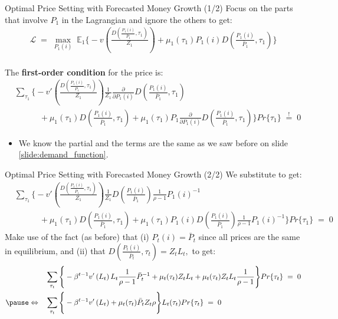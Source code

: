 \documentclass[10pt,c,aspectratio=1610,handout]{beamer}
\begin{document}
\begin{frame}{Optimal Price Setting with Forecasted Money Growth (1/2)}%
  Focus on the parts that involve $P_1$ in the Lagrangian and ignore the others to get:%
  \begin{align*}%
    \mathcal{L} \; = \; \max_{P_1(i)} \; \mathbb{E}_1 \Bigg\{ -v \left( \frac{D\left( \frac{P_{1}(i)}{\bar{P}_{1}}, \tau_1 \right)}{Z_{1}} \right) + \mu_1(\tau_1) P_1(i) D \left( \frac{P_{1}(i)}{\bar{P}_{1}}, \tau_1 \right)  \Bigg\}%
  \end{align*}\\%
  \vspace*{0.2in}%
  \pause%
  The \textbf{first-order condition} for the price is:%
  \begin{align*}%
    & \sum_{\tau_1} \Bigg \{ -v'\left( \frac{D\left( \frac{P_{1}(i)}{\bar{P}_{1}}, \tau_1 \right)}{Z_{1}} \right) \frac{1}{Z_{1}} \frac{\partial}{\partial P_1(i)} D\left( \frac{P_{1}(i)}{\bar{P}_{1}}, \tau_1 \right)\\%
    & \quad \quad \quad + \mu_1(\tau_1) D \left( \frac{P_{1}(i)}{\bar{P}_{1}}, \tau_1 \right) + \mu_1(\tau_1) P_{1} \frac{\partial}{\partial P_1(i)} D \left( \frac{P_{1}(i)}{\bar{P}_{1}}, \tau_1 \right)  \Bigg \} Pr\{\tau_1\} \; \overset{!}{=} \; 0%
  \end{align*}%
  \begin{itemize}%
    \item[$\rightarrow$] We know the partial and the terms are the same as we saw before on slide \ref{slide:demand_function}.%
  \end{itemize}%
\end{frame}%
\begin{frame}{Optimal Price Setting with Forecasted Money Growth (2/2)}%
  We substitute to get:%
  \begin{align*}%
    & \sum_{\tau_1} \Bigg\{ -v'\left( \frac{D \left( \frac{P_{1}(i)}{\bar{P}_{1}}, \tau_1 \right)}{Z_{1}} \right) \frac{1}{Z_{1}} D \left( \frac{P_{1}(i)}{\bar{P}_1} \right) \frac{1}{\rho-1}P_{1}(i)^{-1}\\%
    & \quad \quad \quad + \mu_1(\tau_1) D \left( \frac{P_{1}(i)}{\bar{P}_{1}}, \tau_1 \right) + \mu_1(\tau_1) P_{1}(i) D \left( \frac{P_{1}(i)}{\bar{P}_1} \right) \frac{1}{\rho-1}P_{1}(i)^{-1}  \Bigg \} Pr\{\tau_1\} \; = \; 0%
  \end{align*}%
  \pause%
  Make use of the fact (as before) that (i) $P_{t}(i) = \bar{P}_{t}$ since all prices are the same in equilibrium, and (ii) that $D \left( \frac{P_{t}(i)}{\bar{P}_{t}},\tau_{t}\right) = Z_{t} L_{t},$ to get:%
  \begin{align*}%
    & \sum_{\tau_t} \Bigg \{ -\beta^{t-1} v'\left( L_t \right)L_t \frac{1}{\rho-1} \bar P_{t}^{-1} + \mu_t(\tau_t) Z_t L_t + \mu_t(\tau_t) Z_t L_t \frac{1}{\rho-1}  \Bigg \} Pr\{\tau_t\} \; = \; 0\\%
    \pause%
    \Leftrightarrow \quad & \sum_{\tau_t} \Bigg \{ -\beta^{t-1} v'\left( L_t \right) + \mu_t(\tau_t) \bar P_{t} Z_t \rho \Bigg \} L_t(\tau_t) Pr\{\tau_t\} \; = \; 0%
  \end{align*}%
\end{frame}%
\end{document}
